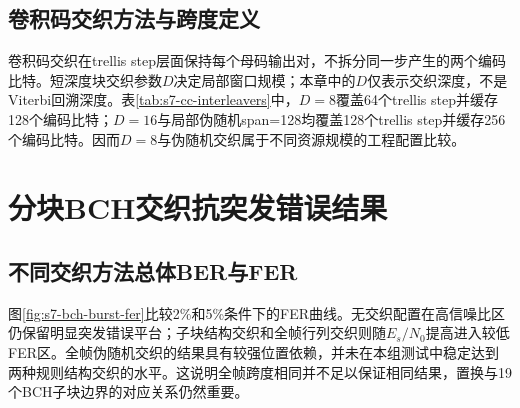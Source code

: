 \subsection{卷积码交织方法与跨度定义}

卷积码交织在trellis step层面保持每个母码输出对，不拆分同一步产生的两个编码比特。短深度块交织参数$D$决定局部窗口规模；本章中的$D$仅表示交织深度，不是Viterbi回溯深度。表\ref{tab:s7-cc-interleavers}中，$D=8$覆盖64个trellis step并缓存128个编码比特；$D=16$与局部伪随机span=128均覆盖128个trellis step并缓存256个编码比特。因而$D=8$与伪随机交织属于不同资源规模的工程配置比较。

\begin{table}[htbp]
  \centering
  \caption{卷积码正式交织方案定义}
  \label{tab:s7-cc-interleavers}
  \footnotesize
\end{table}

\section{分块BCH交织抗突发错误结果}

\subsection{不同交织方法总体BER与FER}

图\ref{fig:s7-bch-burst-fer}比较2\%和5\%条件下的FER曲线。无交织配置在高信噪比区仍保留明显突发错误平台；子块结构交织和全帧行列交织则随$E_s/N_0$提高进入较低FER区。全帧伪随机交织的结果具有较强位置依赖，并未在本组测试中稳定达到两种规则结构交织的水平。这说明全帧跨度相同并不足以保证相同结果，置换与19个BCH子块边界的对应关系仍然重要。

